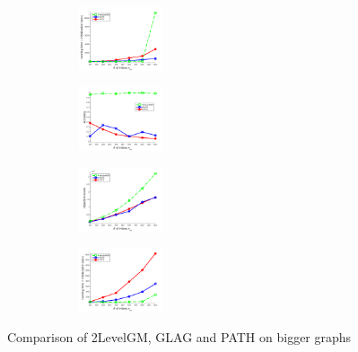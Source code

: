\documentclass[hyperref={pdfpagelabels=false}]{beamer}
\begin{document}
\begin{frame}[allowframebreaks]
\begin{figure}[h]
\begin{subfigure}[b]{0.32\textwidth}
		\end{subfigure} 
		\begin{subfigure}[b]{0.32\textwidth}
			\centering
			\includegraphics[width=2.5cm]{"fig/evaluation/SyntheticTest_BigGraphs/descr/Results_v4.3.3/Test2/time_summary_avg1t"} 
		\end{subfigure} 	
\end{figure}
\vspace{-20pt}
\begin{figure}[h] 
		\begin{subfigure}[b]{0.32\textwidth}
			\centering
			\includegraphics[width=2.5cm]{"fig/evaluation/SyntheticTest_BigGraphs/descr/Results_v4.3.3/Test3/accuracy_avg1t"} 
		\end{subfigure}
		\begin{subfigure}[b]{0.32\textwidth}
			\centering
			\includegraphics[width=2.5cm]{"fig/evaluation/SyntheticTest_BigGraphs/descr/Results_v4.3.3/Test3/score_avg1t"} 
		\end{subfigure} 
		\begin{subfigure}[b]{0.32\textwidth}
			\centering
			\includegraphics[width=2.5cm]{"fig/evaluation/SyntheticTest_BigGraphs/descr/Results_v4.3.3/Test3/time_summary_avg1t"} 
		\end{subfigure} 	
\end{figure}
Comparison of 2LevelGM, GLAG and PATH on bigger graphs
\end{frame}
\end{document}
